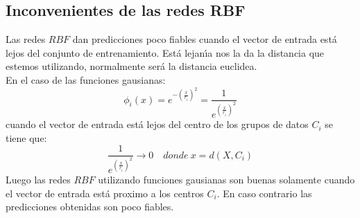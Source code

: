 %
%

\subsection{Inconvenientes de las redes RBF}

Las redes $RBF$ dan predicciones poco fiables cuando el vector de entrada est\'a
lejos del conjunto de entrenamiento. Est\'a lejan\'{\i}a nos la da la distancia
que estemos utilizando, normalmente ser\'a la distancia euclidea.\\

En el caso de las funciones gausianas: 
\begin{displaymath}
\phi_i(x)=e^{-(\frac{x}{r_i})^2} = \frac{1}{e^{(\frac{x}{r_i})^2}}
\end{displaymath}
cuando el vector de entrada est\'a lejos del centro de los grupos de datos $C_i$
se tiene que:
\begin{displaymath}
\frac{1}{e^{(\frac{x}{r_i})^2}}\to 0\quad donde\ x=d(X,C_i)
\end{displaymath}
Luego las redes $RBF$ utilizando funciones gausianas son buenas solamente cuando
el vector de entrada est\'a proximo a los centros $C_i$. En caso contrario las
predicciones obtenidas son poco fiables.
